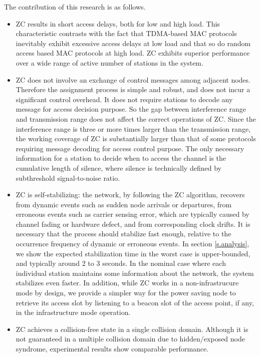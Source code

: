 \documentclass{acm_proc_article-sp}
\begin{document}
The contribution of this research is as follows.
\begin{itemize}
\item ZC results in short access delays, both for low and high load. This characteristic contrasts with the fact that TDMA-based MAC protocols inevitably exhibit excessive access delays at low load and that so do random access based MAC protocols at high load. ZC exhibits superior performance over a wide range of active number of stations in the system.
\item ZC does not involve an exchange of control messages among adjacent nodes. Therefore the assignment process is simple and robust, and does not incur a significant control overhead. It does not require stations to decode any message for access decision purpose. So the gap between interference range and transmission range does not affect the correct operations of ZC. Since the interference range is three or more times larger than the transmission range, the working coverage of ZC is substantially larger than that of some protocols requiring message decoding for access control purpose. The only necessary information for a station to decide when to access the channel is the cumulative length of silence, where silence is technically defined by subthreshold signal-to-noise ratio.
\item ZC is self-stabilizing: the network, by following the ZC algorithm, recovers from dynamic events such as sudden node arrivals or departures, from erroneous events such as carrier sensing error, which are typically caused by channel fading or hardware defect, and from corresponding clock drifts. It is necessary that the process should stabilize fast enough, relative to the occurrence frequency of dynamic or erroneous events. In section \ref{s.analysis}, we show the expected stabilization time in the worst case is upper-bounded, and typically around 2 to 3 seconds. In the nominal case where each individual station maintains some information about the network, the system stabilizes even faster. In addition, while ZC works in a non-infrastrucure mode by design, we provide a simpler way for the power saving node to retrieve its access slot by listening to a beacon slot of the access point, if any, in the infrastructure mode operation.
\item ZC achieves a collision-free state in a single collision domain. Although it is not guaranteed in a multiple collision domain due to hidden/exposed node syndrome, experimental results show comparable performance.


\end{itemize}
\end{document}

